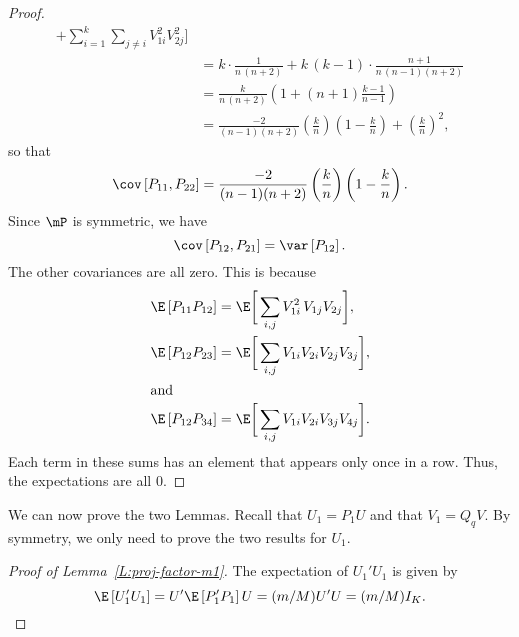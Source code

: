 \begin{proof}
\begin{align*}
                  + \sum_{i=1}^k
                    \sum_{j\neq i} V_{1i}^2 V_{2j}^2
              \bigg] \\
        &= k \cdot \frac{1}{ n \, (n+2) }
           + k \, (k-1) \cdot \frac{ n+1 }{ n \, (n-1) (n+2) } \\
        &= \frac{k}{ n \, (n+2) }
           \left( 1 + (n+1) \frac{k-1}{n-1} \right) \\
        &= \frac{-2}{(n-1)(n+2)}
           \left(\frac{k}{n}\right) \left( 1 - \frac{k}{n} \right)
           + \left( \frac{k}{n} \right)^2,
    \end{align*}
    so that
    \[
        \cov \left[ P_{11}, P_{22} \right]
        = \frac{-2}{ (n-1) (n+2) }
           \left(\frac{k}{n}\right) \left( 1 - \frac{k}{n} \right).
    \]
    Since $\mP$ is symmetric, we have
    \[
        \cov \left[ P_{12}, P_{21} \right]
        = \var \left[ P_{12} \right].
    \]
    The other covariances are all zero.  This is because
    \begin{align*}
        \E \left[ P_{11} P_{12} \right]
        &= \E \bigg[ 
                  \sum_{i,j} V_{1i}^2 \, V_{1j}  V_{2j} 
              \bigg], \\
        \E \left[ P_{12} P_{23} \right]
        &= \E \bigg[ 
                \sum_{i,j} V_{1i} V_{2i} V_{2j} V_{3j}
              \bigg], \\
    \intertext{and}
        \E \left[ P_{12} P_{34} \right]
        &= \E \bigg[ 
                \sum_{i,j} V_{1i} V_{2i} V_{3j} V_{4j}
              \bigg].
    \end{align*}
    Each term in these sums has an element that appears only once in a row.
    Thus, the expectations are all $0$.
\end{proof}

We can now prove the two Lemmas.  Recall that $U_1 = P_1 U$ and that 
$V_1 = Q_q V$.  By symmetry, we only need to prove the two results for $U_1$.

\begin{proof}[Proof of Lemma~\ref{L:proj-factor-m1}]
    The expectation of $U_1' U_1$ is given by
    \[
        \E \left[ U_1' U_1 \right] 
        = U' \E \left[ P_1' P_1 \right] U 
        = (m/M) U' U 
        = (m/M) I_K.  
    \]
\end{proof}
    
